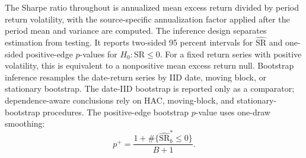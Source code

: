 \documentclass[12pt,a4paper]{article}
\newcommand{\SR}{\mathrm{SR}}
\begin{document}
The Sharpe ratio throughout is annualized mean excess return divided by
period return volatility, with the source-specific annualization factor
applied after the period mean and variance are computed.  The inference
design separates estimation from testing.  It reports two-sided
95 percent intervals for \(\widehat{\SR}\) and one-sided positive-edge
\(p\)-values for \(H_0:\SR\le0\).  For a fixed return series with
positive volatility, this is equivalent to a nonpositive mean excess
return null.  Bootstrap inference resamples the date-return series by
IID date, moving block, or stationary bootstrap.  The date-IID bootstrap
is reported only as a comparator; dependence-aware conclusions rely on
HAC, moving-block, and stationary-bootstrap procedures.
The positive-edge bootstrap \(p\)-value uses one-draw smoothing:
\begin{equation}
  p^+ = \frac{1+\#\{\widehat{\SR}_b^*\le 0\}}{B+1}.
\end{equation}
\end{document}

